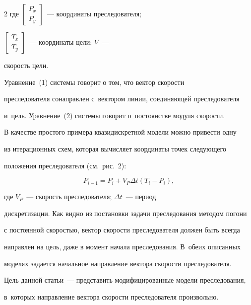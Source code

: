 \begin{multicols}{2}
где $\begin{bmatrix} P_x \\ P_y \end{bmatrix}$~--- координаты преследователя; 


$\begin{bmatrix} T_x\\ T_y \end{bmatrix}$~--- координаты цели; $V$~--- 


скорость цели.





  Уравнение~(1) системы говорит о том, что вектор скорости 


преследователя сонаправлен с~вектором линии, соединяющей преследователя 


и~цель. Уравнение~(2) сис\-те\-мы говорит о~постоянстве модуля ско\-рости.


  


 














  В качестве простого примера квазидискретной модели можно привести одну 


из итерационных схем, которая вычисляет координаты точек следующего 


положения преследователя (см.\ рис.~2): 


$$


P_{i-1}= P_i+ V_P \Delta t \left (T_i-  P_i\right),


$$


 где $V_P$~--- скорость преследователя; $\Delta t$~--- период 


дискретизации. Как видно из постановки задачи преследования методом погони 


с постоянной скоростью, вектор скорости преследователя должен быть всегда 


направлен на цель, даже в момент начала преследования. В~обеих описанных 


моделях задается начальное направление вектора скорости преследователя. 


Цель данной статьи~--- представить модифицированные модели преследования, 


в~которых направление вектора скорости преследователя произвольно.






\end{multicols}
